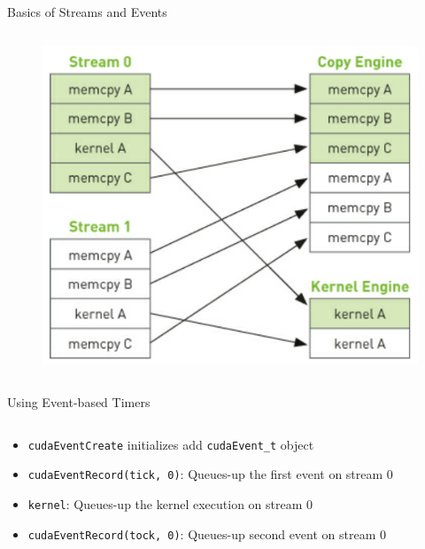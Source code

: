 \documentclass{beamer}
\begin{document}
\begin{frame}{Basics of Streams and Events}
\begin{columns}
\begin{column}{0.4\textwidth}
\begin{figure}
                    \includegraphics[width=\textwidth]{img/04/cu-by-ex-10-3.png}
                \end{figure}
            \end{column}
        \end{columns}
    \end{frame}

    \begin{frame}{Using Event-based Timers}
        \begin{columns}
            \begin{column}{0.4\textwidth}
            {\footnotesize
            \begin{itemize}
                \item \texttt{cudaEventCreate} initializes add \texttt{cudaEvent\_t} object
                \item \texttt{cudaEventRecord(tick, 0)}:  Queues-up the first event on stream 0
                \item \texttt{kernel}: Queues-up the kernel execution on stream 0
                \item \texttt{cudaEventRecord(tock, 0)}: Queues-up second event on stream 0
            \end{itemize}
            }
            \end{column}
            \begin{column}{0.6\textwidth}
                \begin{block}{}
                    \inputminted{cuda}{src/gpu-timer.cu}
                \end{block}
            \end{column}
        \end{columns}
    \end{frame}
\end{document}
